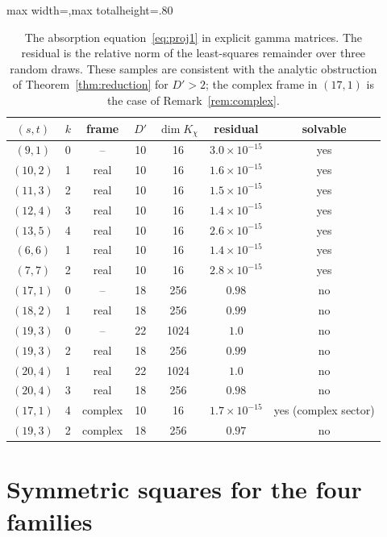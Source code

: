 \begin{table}[htbp]
\centering
\begin{adjustbox}{max width=\linewidth,max totalheight=.80\textheight}\begin{tabular}{@{}ccccccc@{}}
\toprule
$(s,t)$ & $k$ & frame & $D'$ & $\dim K_\chi$ & residual & solvable \\
\midrule
$(9,1)$ & 0 & -- & 10 & 16 & $3.0\times10^{-15}$ & yes\\
$(10,2)$ & 1 & real & 10 & 16 & $1.6\times10^{-15}$ & yes\\
$(11,3)$ & 2 & real & 10 & 16 & $1.5\times10^{-15}$ & yes\\
$(12,4)$ & 3 & real & 10 & 16 & $1.4\times10^{-15}$ & yes\\
$(13,5)$ & 4 & real & 10 & 16 & $2.6\times10^{-15}$ & yes\\
$(6,6)$ & 1 & real & 10 & 16 & $1.4\times10^{-15}$ & yes\\
$(7,7)$ & 2 & real & 10 & 16 & $2.8\times10^{-15}$ & yes\\
$(17,1)$ & 0 & -- & 18 & 256 & $0.98$ & no\\
$(18,2)$ & 1 & real & 18 & 256 & $0.99$ & no\\
$(19,3)$ & 0 & -- & 22 & 1024 & $1.0$ & no\\
$(19,3)$ & 2 & real & 18 & 256 & $0.99$ & no\\
$(20,4)$ & 1 & real & 22 & 1024 & $1.0$ & no\\
$(20,4)$ & 3 & real & 18 & 256 & $0.98$ & no\\
$(17,1)$ & 4 & complex & 10 & 16 & $1.7\times10^{-15}$ & yes (complex sector)\\
$(19,3)$ & 2 & complex & 18 & 256 & $0.97$ & no\\
\bottomrule
\end{tabular}\end{adjustbox}
\caption{The absorption equation~\eqref{eq:proj1} in explicit gamma matrices. The residual is the relative norm of the least-squares remainder over three random draws. These samples are consistent with the analytic obstruction of Theorem~\ref{thm:reduction} for $D'>2$; the complex frame in $(17,1)$ is the case of Remark~\ref{rem:complex}.}
\label{tab:absorb}
\end{table}

\section{Symmetric squares for the four families}
\label{app:tables}

